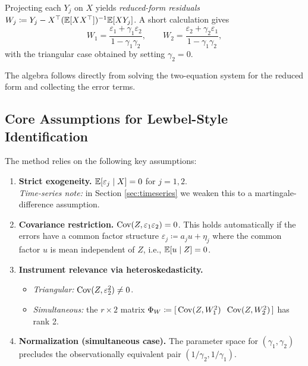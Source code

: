 Projecting each $Y_{j}$ on $X$ yields \emph{reduced-form residuals}
$W_{j}\coloneqq Y_{j}-X^{\top}(\mathbb{E}[XX^{\top}])^{-1}\mathbb{E}[XY_{j}]$. A short calculation
gives
\[
W_{1}=\frac{\varepsilon_{1}+\gamma_{1}\varepsilon_{2}}{1-\gamma_{1}\gamma_{2}},\qquad W_{2}=\frac{\varepsilon_{2}+\gamma_{2}\varepsilon_{1}}{1-\gamma_{1}\gamma_{2}},
\]
with the triangular case obtained by setting $\gamma_{2}=0$.

\begin{remark} The algebra follows directly from solving the two-equation
system for the reduced form and collecting the error terms. \end{remark}

\subsection{Core Assumptions for Lewbel-Style Identification}

The method relies on the following key assumptions:

\begin{enumerate}[label=(LW\arabic*), ref=(LW\arabic*)]
\item \label{enu:exogeneity}\textbf{Strict exogeneity.} $\mathbb{E}[\varepsilon_{j}\mid X]=0$
for $j=1,2$. \\ \emph{Time-series note:} in Section \ref{sec:timeseries}
we weaken this to a martingale-difference assumption.
\item \label{enu:error_covariance}\textbf{Covariance restriction.} $\operatorname{Cov}(Z,\varepsilon_{1}\varepsilon_{2})=0$.
This holds automatically if the errors have a common factor structure
$\varepsilon_{j}\coloneqq a_{j}u+\eta_{j}$ where the common factor
$u$ is mean independent of $Z$, i.e., $\mathbb{E}[u\mid Z]=0$.
\item \label{enu:het}\textbf{Instrument relevance via heteroskedasticity.}
\begin{itemize}
\itemsep2pt
\item \emph{Triangular:} $\operatorname{Cov}(Z,\varepsilon_{2}^{2})\neq0$.
\item \emph{Simultaneous:} the $r\times2$ matrix $\Phi_{W}\coloneqq[\,\operatorname{Cov}(Z,W_{1}^{2})\;\;\operatorname{Cov}(Z,W_{2}^{2})\,]$
has rank 2.
\end{itemize}
\item \textbf{\label{enu:norm}Normalization (simultaneous case).} The parameter
space for $(\gamma_{1},\gamma_{2})$ precludes the observationally
equivalent pair $(1/\gamma_{2},1/\gamma_{1})$.
\end{enumerate}

